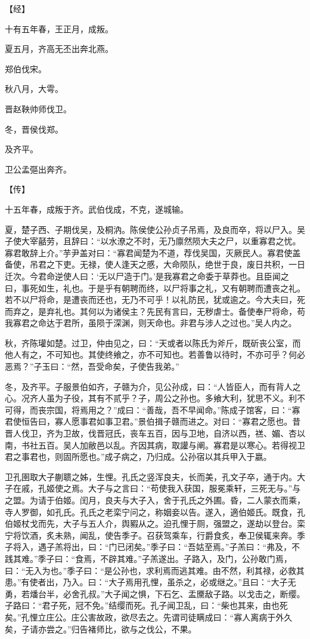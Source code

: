 \documentclass[a4paper,12pt,UTF8,twoside]{ctexbook}
\begin{document}
【经】

十有五年春，王正月，成叛。

夏五月，齐高无丕出奔北燕。

郑伯伐宋。

秋八月，大雩。

晋赵鞅帅师伐卫。

冬，晋侯伐郑。

及齐平。

卫公孟彄出奔齐。

【传】

十五年春，成叛于齐。武伯伐成，不克，遂城输。

夏，楚子西、子期伐吴，及桐汭。陈侯使公孙贞子吊焉，及良而卒，将以尸入。吴子使大宰嚭劳，且辞曰：“以水潦之不时，无乃廪然陨大夫之尸，以重寡君之忧。寡君敢辞上介。”芋尹盖对曰：“寡君闻楚为不道，荐伐吴国，灭厥民人。寡君使盖备使，吊君之下吏。无禄，使人逢天之慼，大命陨队，绝世于良，废日共积，一日迁次。今君命逆使人曰：‘无以尸造于门。’是我寡君之命委于草莽也。且臣闻之曰，事死如生，礼也。于是乎有朝聘而终，以尸将事之礼，又有朝聘而遭丧之礼。若不以尸将命，是遭丧而还也，无乃不可乎！以礼防民，犹或逾之。今大夫曰，死而弃之，是弃礼也。其何以为诸侯主？先民有言曰，无秽虐士。备使奉尸将命，苟我寡君之命达于君所，虽陨于深渊，则天命也。非君与涉人之过也。”吴人内之。

秋，齐陈瓘如楚。过卫，仲由见之，曰：“天或者以陈氏为斧斤，既斫丧公室，而他人有之，不可知也。其使终飨之，亦不可知也。若善鲁以待时，不亦可乎？何必恶焉？”子玉曰：“然，吾受命矣，子使告我弟。”

冬，及齐平。子服景伯如齐，子赣为介，见公孙成，曰：“人皆臣人，而有背人之心。况齐人虽为子役，其有不贰乎？子，周公之孙也。多飨大利，犹思不义。利不可得，而丧宗国，将焉用之？”成曰：“善哉，吾不早闻命。”陈成子馆客，曰：“寡君使恒告曰，寡人愿事君如事卫君。”景伯揖子赣而进之。对曰：“寡君之愿也。昔晋人伐卫，齐为卫故，伐晋冠氏，丧车五百，因与卫地，自济以西，禚、媚、杏以南，书社五百。吴人加敝邑以乱。齐因其病，取讙与阐。寡君是以寒心。若得视卫君之事君也，则固所愿也。”成子病之，乃归成。公孙宿以其兵甲入于嬴。

卫孔圉取大子蒯聩之姊，生悝。孔氏之竖浑良夫，长而美，孔文子卒，通于内。大子在戚，孔姬使之焉。大子与之言曰：“苟使我入获国，服冕乘轩，三死无与。”与之盟。为请于伯姬。闰月，良夫与大子入，舍于孔氏之外圃。昏，二人蒙衣而乘，寺人罗御，如孔氏。孔氏之老栾宁问之，称姻妾以告。遂入，適伯姬氏。既食，孔伯姬杖戈而先，大子与五人介，舆豭从之。迫孔悝于厕，强盟之，遂劫以登台。栾宁将饮酒，炙未熟，闻乱，使告季子。召获驾乘车，行爵食炙，奉卫侯辄来奔。季子将入，遇子羔将出，曰：“门已闭矣。”季子曰：“吾姑至焉。”子羔曰：“弗及，不践其难。”季子曰：“食焉，不辟其难。”子羔遂出。子路入，及门，公孙敢门焉，曰：“无入为也。”季子曰：“是公孙也，求利焉而逃其难。由不然，利其禄，必救其患。”有使者出，乃入。曰：“大子焉用孔悝，虽杀之，必或继之。”且曰：“大子无勇，若燔台半，必舍孔叔。”大子闻之惧，下石乞、盂黡敌子路。以戈击之，断缨。子路曰：“君子死，冠不免。”结缨而死。孔子闻卫乱，曰：“柴也其来，由也死矣。”孔悝立庄公。庄公害故政，欲尽去之。先谓司徒瞒成曰：“寡人离病于外久矣，子请亦尝之。”归告褚师比，欲与之伐公，不果。
\end{document}
